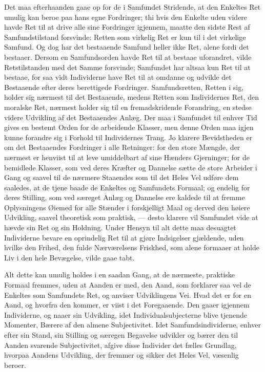 \documentclass[12pt]{book}
\newcommand{\apage}[1]{\marginnote{\footnotesize\textit{[#1]}}}
\begin{document}
Det maa efterhaanden gaae op for de i Samfundet Stridende, at den Enkeltes Ret
umulig kan beroe paa hans egne Fordringer; thi hvis den Enkelte uden videre
havde Ret til at drive alle sine Fordringer igjennem, maatte den sidste Rest
af Samfundstilstand forsvinde: Retten som virkelig Ret er kun til i det
virkelige Samfund. Og dog har det bestaaende Samfund heller ikke Ret, alene
fordi det bestaaer. Dersom en Samfundsorden havde Ret til at bestaae
uforandret, vilde Retstilstanden med det Samme forsvinde; Samfundet har altsaa
kun Ret til at bestaae, for saa vidt Individerne have Ret til at omdanne og
udvikle det Bestaaende efter deres berettigede Fordringer. Samfundsretten,
Retten i sig, holder sig nærmest til det Bestaaende, medens Retten som
Individernes Ret, den moralske Ret, nærmest holder sig til en fremadskridende
Forandring, en stedse videre Udvikling af det Bestaaendes Anlæg. Der maa i
Samfundet til enhver Tid gives en bestemt Orden for de arbeidende Klasser, men
denne Orden maa igjen kunne forandre sig i Forhold til Individernes Trang. Jo
klarere Bevidstheden er om det Bestaaendes Fordringer i alle Retninger: for
den store Mængde, der nærmest er henviist til at leve umiddelbart af sine
Hænders Gjerninger; for de bemidlede Klasser, som ved deres Kræfter og
Dannelse sætte de store Arbeider i Gang og saavel til de nærmere Staaendes som
til det Heles Vel udføre dem saaledes, at de tjene baade de Enkeltes \apage{267} og
Samfundets Formaal; og endelig for deres Stilling, som ved særeget Anlæg og
Dannelse ere kaldede til at fremme Oplysningens Øiemed for alle Stænder i
forskjelligt Maal og derved den høiere Udvikling, saavel theoretisk som
praktisk, --- desto klarere vil Samfundet vide at hævde sin Ret og sin
Holdning. Under Hensyn til alt dette maa desuagtet Individerne bevare en
oprindelig Ret til at gjøre Indsigelser gjældende, uden hvilke den Frihed, den
fulde Nærværelsens Friskhed, som alene formaaer at holde Liv i den hele
Bevægelse, vilde gaae tabt.

Alt dette kan umulig holdes i en saadan Gang, at de nærmeste, praktiske
Formaal fremmes, uden at Aanden er med, den Aand, som forklarer saa vel de
Enkeltes som Samfundets Ret, og anviser Udviklingens Vei. Hvad det er for en
Aand, og hvorfra den kommer, er viist i det Foregaaende. Den gaaer igjennem
Individerne, og naaer sin Udvikling, idet Individualsubjecterne blive tjenende
Momenter, Bærere af den almene Subjectivitet. Idet Samfundsindividerne, enhver
efter sin Stand, sin Stilling og særegen Begavelse udvikler og bærer den til
Aanden svarende Subjectivitet, afgive disse Individer det fælles Grundlag,
hvorpaa Aandens Udvikling, der fremmer og sikker det Heles Vel, væsenlig
beroer.
\end{document}
